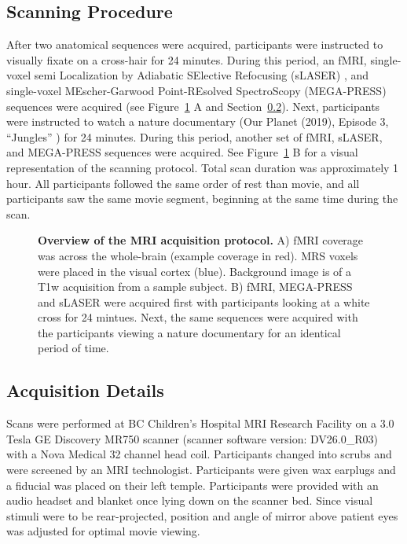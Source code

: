 \documentclass[
true
]{sn-jnl}
\makeatletter
\newcommand*\pandocbounded[1]{%
  \sbox\pandoc@box{#1}%
  \Gscale@div\@tempa{\textheight}{\dimexpr\ht\pandoc@box+\dp\pandoc@box\relax}%
  \Gscale@div\@tempb{\linewidth}{\wd\pandoc@box}%
  \ifdim\@tempb\p@<\@tempa\p@\let\@tempa\@tempb\fi%
  \ifdim\@tempa\p@<\p@\scalebox{\@tempa}{\usebox\pandoc@box}%
  \else\usebox{\pandoc@box}%
  \fi%
}
\makeatother
\begin{document}
\subsection{Scanning Procedure}\label{scanning-procedure}

After two anatomical sequences were acquired, participants were
instructed to visually fixate on a cross-hair for 24 minutes. During
this period, an fMRI, single-voxel semi Localization by Adiabatic
SElective Refocusing (sLASER)
\citep{ozShortechoSingleshotFullintensity2011}, and single-voxel
MEscher-Garwood Point-REsolved SpectroScopy (MEGA-PRESS)
\citep{mescherSimultaneousVivoSpectral1998} sequences were acquired (see
Figure~\ref{fig-method} A and Section~\ref{sec-mriacq}). Next,
participants were instructed to watch a nature documentary (Our Planet
(2019), Episode 3, ``Jungles'' \citet{cordeyJungles2019}) for 24
minutes. During this period, another set of fMRI, sLASER, and MEGA-PRESS
sequences were acquired. See Figure~\ref{fig-method} B for a visual
representation of the scanning protocol. Total scan duration was
approximately 1 hour. All participants followed the same order of rest
than movie, and all participants saw the same movie segment, beginning
at the same time during the scan.

\label{cell-fig-method}
\begin{figure}[H]

\centering{

\pandocbounded{\texttt{[image: index\_files/figure-pdf/fig-method-1.pdf]}}

}

\caption{\label{fig-method}\textbf{Overview of the MRI acquisition
protocol.} A) fMRI coverage was across the whole-brain (example coverage
in red). MRS voxels were placed in the visual cortex (blue). Background
image is of a T1w acquisition from a sample subject. B) fMRI, MEGA-PRESS
and sLASER were acquired first with participants looking at a white
cross for 24 mintues. Next, the same sequences were acquired with the
participants viewing a nature documentary for an identical period of
time.}

\end{figure}%

\subsection{Acquisition Details}\label{sec-mriacq}

Scans were performed at BC Children's Hospital MRI Research Facility on
a 3.0 Tesla GE Discovery MR750 scanner (scanner software version:
DV26.0\_R03) with a Nova Medical 32 channel head coil. Participants
changed into scrubs and were screened by an MRI technologist.
Participants were given wax earplugs and a fiducial was placed on their
left temple. Participants were provided with an audio headset and
blanket once lying down on the scanner bed. Since visual stimuli were to
be rear-projected, position and angle of mirror above patient eyes was
adjusted for optimal movie viewing.
\end{document}
